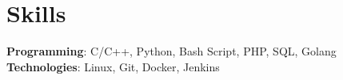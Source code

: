 \documentclass[A4,11pt]{article}
\makeatletter
\newcommand{\CVSubheading}[4]{
  \vspace{-2pt}\item
    \begin{tabular*}{0.97\textwidth}[t]{l@{\extracolsep{\fill}}r}
      \textbf{#1} & #2 \\
      \small#3 & \small #4 \\
    \end{tabular*}\vspace{-7pt}
}
\newcommand{\CVSubHeadingListStart}{\begin{itemize}[leftmargin=0.5cm, label={}]}
\newcommand{\CVSubHeadingListEnd}{\end{itemize}}
\makeatother
\begin{document}
\begin{comment}
  Section is here as it applied to my application for positions in academia. 
  Remember to tailor the resume for to the position.
  \end{comment}
  


\begin{comment}
This section is compressed from the various skills sections that Euro CV
recommends.
\end{comment}

\section{Skills}
 \begin{itemize}[leftmargin=0.5cm, label={}]
    \small{\item{
      \textbf{Programming}{: C/C++, Python, Bash Script, PHP, SQL, Golang} \\
      \textbf{Technologies}{: Linux, Git, Docker, Jenkins} \\
    }}
 \end{itemize}
    
\end{document}
